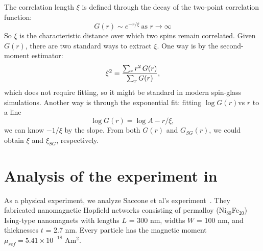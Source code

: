\documentclass[
    aps,
    prb,
    reprint,           %
    superscriptaddress,%
    amsmath,amssymb,
    floatfix
]{revtex4-2}
\begin{document}
The correlation length $\xi$ is defined through the decay of the two-point correlation function:
\begin{equation}
G(r)\sim e^{-r/\xi }\ \text{as\ }r\rightarrow \infty 
  \label{eq:26}
\end{equation}
So $\xi$ is the characteristic distance over which two spins remain correlated.
Given $G(r)$, there are two standard ways to extract $\xi$. One way is by the second-moment estimator:
\begin{equation}
{\xi }^{2}=\frac{\sum_{r} r^{2}\text{\,}G(r)}{\sum_{r} G(r)},
  \label{eq:27}
\end{equation}
which does not require fitting, so it might be standard in modern spin-glass simulations. Another way is through the exponential fit: fitting $\log{G}(r)$vs $r$ to a line
\begin{equation}
\log{G}(r)=\log{A}-r/\xi,
  \label{eq:28}
\end{equation}
we can know $-1/\xi$ by the slope.
From both $G(r)$ and $G_{SG}(r)$, we could obtain $\xi$ and $\xi_{SG}$, respectively. 



\section{Analysis of the experiment in \cite{Saccone2022}}
\label{sec:anal}
As a physical experiment, we analyze Saccone et al's experiment~\cite{Saccone2022}. They fabricated nanomagnetic Hopfield networks consisting of permalloy (Ni$_{80}$Fe$_{20}$) Ising-type nanomagnets with lengths $L$ = 300 nm, widths $W$ = 100 nm, and thicknesses $t$ = 2.7 nm. Every particle has the magnetic moment $\mu_{ref} = 5.41 \times 10^{-18}$ Am$^2$.
\end{document}
